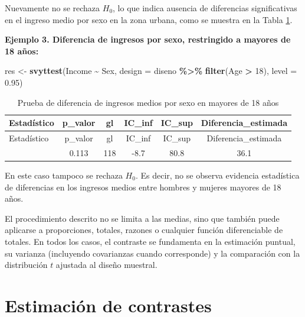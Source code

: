 \documentclass[
  spanish,
  12pt,
]{book}
\newenvironment{Shaded}{\begin{snugshade}}{\end{snugshade}}
\newcommand{\AttributeTok}[1]{\textcolor[rgb]{0.13,0.29,0.53}{#1}}
\newcommand{\DecValTok}[1]{\textcolor[rgb]{0.00,0.00,0.81}{#1}}
\newcommand{\FloatTok}[1]{\textcolor[rgb]{0.00,0.00,0.81}{#1}}
\newcommand{\FunctionTok}[1]{\textcolor[rgb]{0.13,0.29,0.53}{\textbf{#1}}}
\newcommand{\NormalTok}[1]{#1}
\newcommand{\OtherTok}[1]{\textcolor[rgb]{0.56,0.35,0.01}{#1}}
\newcommand{\SpecialCharTok}[1]{\textcolor[rgb]{0.81,0.36,0.00}{\textbf{#1}}}
\begin{document}
Nuevamente no se rechaza \(H_0\), lo que indica ausencia de diferencias significativas en el ingreso medio por sexo en la zona urbana, como se muestra en la Tabla \ref{tab:tab-ttest-sexo-mayores}.

\textbf{Ejemplo 3. Diferencia de ingresos por sexo, restringido a mayores de 18 años:}

\begin{Shaded}
\begin{Highlighting}[]
\NormalTok{res }\OtherTok{\textless{}{-}} \FunctionTok{svyttest}\NormalTok{(Income }\SpecialCharTok{\textasciitilde{}}\NormalTok{ Sex,}
         \AttributeTok{design =}\NormalTok{ diseno }\SpecialCharTok{\%\textgreater{}\%} \FunctionTok{filter}\NormalTok{(Age }\SpecialCharTok{\textgreater{}} \DecValTok{18}\NormalTok{),}
         \AttributeTok{level =} \FloatTok{0.95}\NormalTok{)}
\end{Highlighting}
\end{Shaded}

\begin{longtable}[]{@{}lccccc@{}}
\caption{\label{tab:tab-ttest-sexo-mayores}Prueba de diferencia de ingresos medios por sexo en mayores de 18 años}\tabularnewline
\toprule\noalign{}
Estadístico & p\_valor & gl & IC\_inf & IC\_sup & Diferencia\_estimada \\
\midrule\noalign{}
\endfirsthead
\toprule\noalign{}
Estadístico & p\_valor & gl & IC\_inf & IC\_sup & Diferencia\_estimada \\
\midrule\noalign{}
\endhead
\bottomrule\noalign{}
\endlastfoot
1.6 & 0.113 & 118 & -8.7 & 80.8 & 36.1 \\
\end{longtable}

En este caso tampoco se rechaza \(H_0\). Es decir, no se observa evidencia estadística de diferencias en los ingresos medios entre hombres y mujeres mayores de 18 años.

El procedimiento descrito no se limita a las medias, sino que también puede aplicarse a proporciones, totales, razones o cualquier función diferenciable de totales. En todos los casos, el contraste se fundamenta en la estimación puntual, su varianza (incluyendo covarianzas cuando corresponde) y la comparación con la distribución \(t\) ajustada al diseño muestral.

\section{Estimación de contrastes}\label{estimaciuxf3n-de-contrastes}
\end{document}
